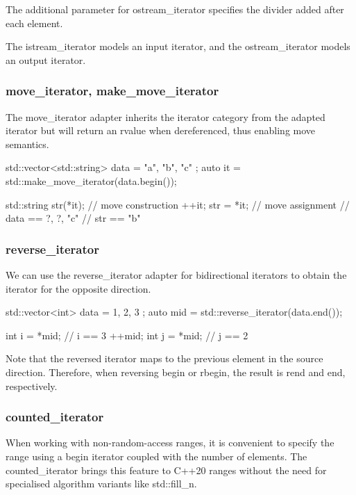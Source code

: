 The additional parameter for ostream\_iterator specifies the divider added after each element.

The istream\_iterator models an input iterator, and the ostream\_iterator models an output iterator.

\subsubsection{move\_iterator, make\_move\_iterator}

The move\_iterator adapter inherits the iterator category from the adapted iterator but will return an rvalue when dereferenced, thus enabling move semantics.

\begin{box-note}
\begin{cppcode}
std::vector<std::string> data = { "a", "b", "c" };
auto it = std::make_move_iterator(data.begin());

std::string str(*it); // move construction
++it;
str = *it; // move assignment
// data == { ?, ?, "c" }
// str == "b"
\end{cppcode}
\end{box-note}

\subsubsection{reverse\_iterator}

We can use the reverse\_iterator adapter for bidirectional iterators to obtain the iterator for the opposite direction.

\begin{box-note}
\begin{cppcode}
std::vector<int> data = { 1, 2, 3 };
auto mid = std::reverse_iterator(data.end());

int i = *mid; // i == 3
++mid;
int j = *mid; // j == 2
\end{cppcode}
\end{box-note}

Note that the reversed iterator maps to the previous element in the source direction. Therefore, when reversing begin or rbegin, the result is rend and end, respectively.

\subsubsection{counted\_iterator}

When working with non-random-access ranges, it is convenient to specify the range using a begin iterator coupled with the number of elements. The counted\_iterator brings this feature to C++20 ranges without the need for specialised algorithm variants like std::fill\_n.


